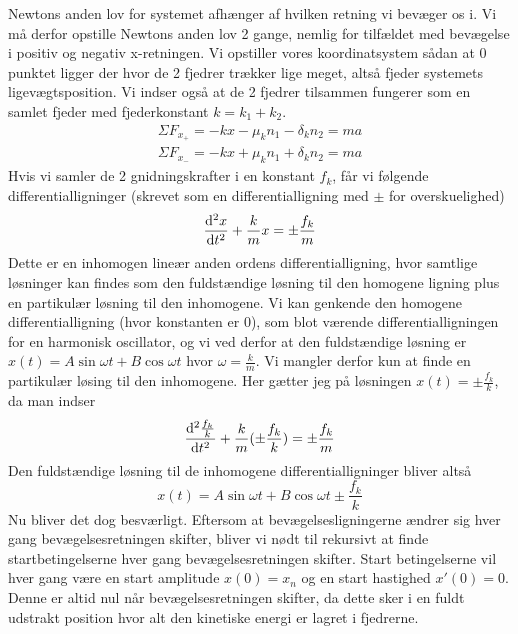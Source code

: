 Newtons anden lov for systemet afhænger af hvilken retning vi bevæger os i. 
Vi må derfor opstille Newtons anden lov 2 gange, nemlig for tilfældet med bevægelse i positiv og negativ x-retningen. 
Vi opstiller vores koordinatsystem sådan at 0 punktet ligger der hvor de 2 fjedrer trækker lige meget, altså fjeder systemets ligevægtsposition. Vi indser også at de 2 fjedrer tilsammen fungerer som en samlet fjeder med fjederkonstant $k = k_1 + k_2$.
\begin{align*}
    \Sigma F_{x_+} = -kx - \mu_k n_1 - \delta_k n_2 = ma\\
    \Sigma F_{x_-} = -kx + \mu_k n_1 + \delta_k n_2 = ma
\end{align*}
Hvis vi samler de 2 gnidningskrafter i en konstant $f_k$, får vi følgende differentialligninger (skrevet som en differentialligning med $\pm$ for overskuelighed)
\begin{equation}
    \odv[order=2]{x}{t} + \frac{k}{m}x = \pm \frac{f_k}{m}
\end{equation}
Dette er en inhomogen lineær anden ordens differentialligning, hvor samtlige løsninger kan findes 
som den fuldstændige løsning til den homogene ligning plus en partikulær løsning til den inhomogene.
Vi kan genkende den homogene differentialligning (hvor konstanten er 0), som blot værende differentialligningen for en harmonisk oscillator, 
og vi ved derfor at den fuldstændige løsning er $x(t) = A\sin\omega t + B\cos\omega t$ hvor $\omega = \frac{k}{m}$. Vi mangler derfor kun at finde en partikulær løsing til den inhomogene.
Her gætter jeg på løsningen $x(t) = \pm \frac{f_k}{k}$, da man indser
\[
     \odv[order=2]{\frac{f_k}{k}}{t} + \frac{k}{m}(\pm\frac{f_k}{k}) = \pm \frac{f_k}{m}
\]
Den fuldstændige løsning til de inhomogene differentialligninger bliver altså
\begin{equation}
    x(t) = A\sin\omega t + B\cos\omega t \pm \frac{f_k}{k}
\end{equation}
Nu bliver det dog besværligt. Eftersom at bevægelsesligningerne ændrer sig hver gang bevægelsesretningen skifter, 
bliver vi nødt til rekursivt at finde startbetingelserne hver gang bevægelsesretningen skifter.
Start betingelserne vil hver gang være en start amplitude $x(0) = x_n$ og en start hastighed $x'(0) = 0$. Denne er altid nul når bevægelsesretningen skifter, da dette sker i en fuldt udstrakt position hvor alt den kinetiske energi er lagret i fjedrerne.

